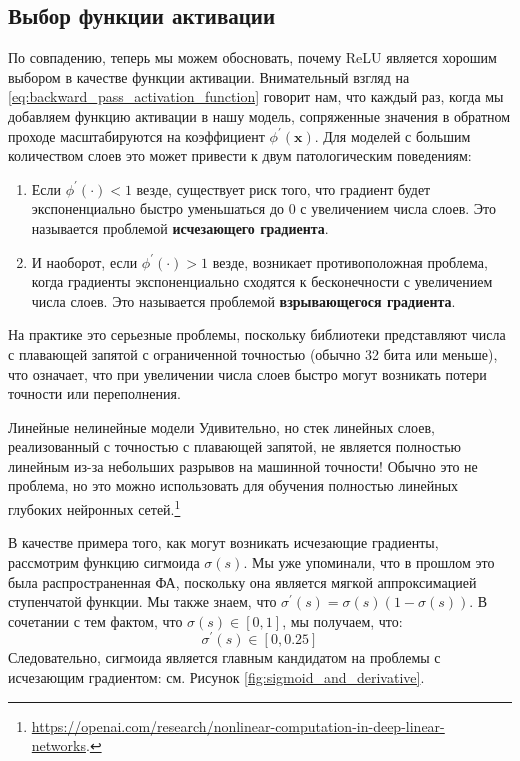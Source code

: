 \subsection{Выбор функции активации}

По совпадению, теперь мы можем обосновать, почему ReLU является хорошим выбором в качестве функции активации. Внимательный взгляд на \eqref{eq:backward_pass_activation_function} говорит нам, что каждый раз, когда мы добавляем функцию активации в нашу модель, сопряженные значения в обратном проходе масштабируются на коэффициент $\phi^\prime(\mathbf{x})$. Для моделей с большим количеством слоев это может привести к двум патологическим поведениям:

\begin{enumerate}
\item Если $\phi^\prime(\cdot) < 1$ везде, существует риск того, что градиент будет экспоненциально быстро уменьшаться до 0 с увеличением числа слоев. Это называется проблемой \textbf{исчезающего градиента}.
\item И наоборот, если $\phi^\prime(\cdot) > 1$ везде, возникает противоположная проблема, когда градиенты экспоненциально сходятся к бесконечности с увеличением числа слоев. Это называется проблемой \textbf{взрывающегося градиента}.
\end{enumerate}

На практике это серьезные проблемы, поскольку библиотеки представляют числа с плавающей запятой с ограниченной точностью (обычно 32 бита или меньше), что означает, что при увеличении числа слоев быстро могут возникать потери точности или переполнения.

\begin{supportbox}{Линейные нелинейные модели}
Удивительно, но стек линейных слоев, реализованный с точностью с плавающей запятой, не является полностью линейным из-за небольших разрывов на машинной точности! Обычно это не проблема, но это можно использовать для обучения полностью линейных глубоких нейронных сетей.\footnote{\url{https://openai.com/research/nonlinear-computation-in-deep-linear-networks}.}
\end{supportbox}

В качестве примера того, как могут возникать исчезающие градиенты, рассмотрим функцию сигмоида $\sigma(s)$. Мы уже упоминали, что в прошлом это была распространенная ФА, поскольку она является мягкой аппроксимацией ступенчатой функции. Мы также знаем, что $\sigma^\prime(s)=\sigma(s)(1-\sigma(s))$. В сочетании с тем фактом, что $\sigma(s) \in \left[0,1\right]$, мы получаем, что:
%
$$\sigma^\prime(s)\in\left[0,0.25\right]$$
%
Следовательно, сигмоида является главным кандидатом на проблемы с исчезающим градиентом: см. Рисунок \ref{fig:sigmoid_and_derivative}.

